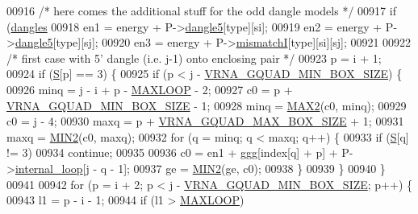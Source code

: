 \begin{DoxyCode}
00916   \textcolor{comment}{/* here comes the additional stuff for the odd dangle models */}
00917   \textcolor{keywordflow}{if} (\mbox{\hyperlink{group__model__details_ga72b511ed1201f7e23ec437e468790d74}{dangles}} %
00918     en1 = energy + P->\mbox{\hyperlink{group__energy__parameters_ad2534b54836d48b4f549b319766f658f}{dangle5}}[type][si];
00919     en2 = energy + P->\mbox{\hyperlink{group__energy__parameters_ad2534b54836d48b4f549b319766f658f}{dangle5}}[type][sj];
00920     en3 = energy + P->\mbox{\hyperlink{group__energy__parameters_af1a456ce5983b107c47e5dd25727205e}{mismatchI}}[type][si][sj];
00921 
00922     \textcolor{comment}{/* first case with 5' dangle (i.e. j-1) onto enclosing pair */}
00923     p = i + 1;
00924     \textcolor{keywordflow}{if} (\mbox{\hyperlink{group__energy__parameters__rw_gga7bf2bb363bcf5ce50d60255d256e5682af1ce01387d2348f8b858721a7db81670}{S}}[p] == 3) \{
00925       \textcolor{keywordflow}{if} (p < j - \mbox{\hyperlink{group__energy__parameters_gad7bdd880afca461f97763d79ee57a347}{VRNA\_GQUAD\_MIN\_BOX\_SIZE}}) \{
00926         minq  = j - i + p - \mbox{\hyperlink{energy__const_8h_ad1bd6eabac419670ddd3c9ed82145988}{MAXLOOP}} - 2;
00927         c0    = p + \mbox{\hyperlink{group__energy__parameters_gad7bdd880afca461f97763d79ee57a347}{VRNA\_GQUAD\_MIN\_BOX\_SIZE}} - 1;
00928         minq  = \mbox{\hyperlink{group__utils_ga33297b3679c713b0c4d897cd0fe3b122}{MAX2}}(c0, minq);
00929         c0    = j - 4;
00930         maxq  = p + \mbox{\hyperlink{group__energy__parameters_ga56cafabad2f8a7db83f2d5d3b0e8d313}{VRNA\_GQUAD\_MAX\_BOX\_SIZE}} + 1;
00931         maxq  = \mbox{\hyperlink{group__utils_gae0b9cd0ce090bd69b951aa73e8fa4f7d}{MIN2}}(c0, maxq);
00932         \textcolor{keywordflow}{for} (q = minq; q < maxq; q++) \{
00933           \textcolor{keywordflow}{if} (\mbox{\hyperlink{group__energy__parameters__rw_gga7bf2bb363bcf5ce50d60255d256e5682af1ce01387d2348f8b858721a7db81670}{S}}[q] != 3)
00934             \textcolor{keywordflow}{continue};
00935 
00936           c0  = en1 + ggg[index[q] + p] + P->\mbox{\hyperlink{group__energy__parameters_a2a4fb2c65023ec371c9b96573da6d2fc}{internal\_loop}}[j - q - 1];
00937           ge  = \mbox{\hyperlink{group__utils_gae0b9cd0ce090bd69b951aa73e8fa4f7d}{MIN2}}(ge, c0);
00938         \}
00939       \}
00940     \}
00941 
00942     \textcolor{keywordflow}{for} (p = i + 2; p < j - \mbox{\hyperlink{group__energy__parameters_gad7bdd880afca461f97763d79ee57a347}{VRNA\_GQUAD\_MIN\_BOX\_SIZE}}; p++) \{
00943       l1 = p - i - 1;
00944       \textcolor{keywordflow}{if} (l1 > \mbox{\hyperlink{energy__const_8h_ad1bd6eabac419670ddd3c9ed82145988}{MAXLOOP}})

\end{DoxyCode}
